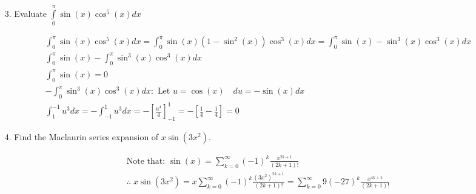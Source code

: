 \begin{itemize}
        \item [3.] Evaluate $\int\limits_{0}^{\pi}\sin(x)\cos^{5}(x)dx$
        \\
        \begin{mdframed}
            \begin{equation*}
                \begin{gathered}
                    \int_{0}^{\pi}\sin(x)\cos^{5}(x)dx = 
                    \int_{0}^{\pi}\sin(x)(1-\sin^{2}(x))\cos^{3}(x)dx =
                    \int_{0}^{\pi}\sin(x)-\sin^{3}(x)\cos^{3}(x)dx                  \\
                    \int_{0}^{\pi}\sin(x)-\int_{0}^{\pi}\sin^{3}(x)\cos^{3}(x)dx    \\
                    \int_{0}^{\pi}\sin(x) = 0                                       \\
                    -\int_{0}^{\pi}\sin^{3}(x)\cos^{3}(x)dx: 
                    \text{ Let } u = \cos(x) \quad du = -\sin(x)dx                  \\
                    \int_{1}^{-1}u^{3}dx = -\int_{-1}^{1}u^{3}dx = 
                    -\left[\frac{u^{4}}{4}\right]_{-1}^{1} =
                    -\left[\frac{1}{4}-\frac{1}{4}\right] = \boxed{0}
                \end{gathered}
            \end{equation*}
        \end{mdframed}

        \item [4.] Find the Maclaurin series expansion of $x\sin(3x^{2})$.
        \\
        \begin{mdframed}
            \begin{equation*}
                \begin{gathered}
                    \text{Note that: } \sin(x) = 
                    \sum_{k=0}^{\infty} (-1)^{k}\frac{x^{2k+1}}{(2k+1)!}   \\
                    \therefore \; x\sin(3x^{2}) = 
                    x\sum_{k=0}^{\infty} (-1)^{k}\frac{(3x^{2})^{2k+1}}{(2k+1)!} =
                    \boxed{\sum_{k=0}^{\infty} 9(-27)^{k}\frac{x^{4k+5}}{(2k+1)!}}
                \end{gathered}
            \end{equation*}
        \end{mdframed}
    \end{itemize}
